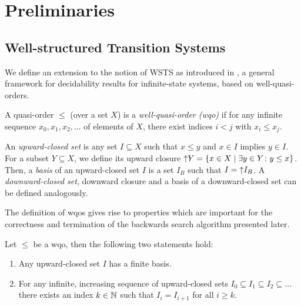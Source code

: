 \documentclass{llncs}
\begin{document}
\section{Preliminaries}
\label{sec:preliminaries}

\subsection{Well-structured Transition Systems}
\label{sec:wsts}

We define an extension to the notion of WSTS as introduced in
\cite{acjt:general-decidability,fs:well-structured-everywhere}, a
general framework for decidability results for infinite-state systems,
based on well-quasi-orders.

\begin{definition}\label{def:wqo}
  A quasi-order %
  $\leq$ (over a set $X$) is a \emph{well-quasi-order (wqo)} if for
  any infinite sequence $x_0, x_1, x_2, \ldots$ of elements of $X$,
  there exist indices $i<j$ with $x_i \leq x_j$.

  An \emph{upward-closed set} is any set $I \subseteq X$ such that $x
  \leq y$ and $x \in I$ implies $y \in I$. For a subset $Y \subseteq
  X$, we define its upward closure $\mathord{\uparrow} Y = \{x \in X \mid \exists y
  \in Y \colon y \leq x\}$.  Then, a \emph{basis} of an upward-closed
  set $I$ is a set $I_B$ such that $I = \mathord{\uparrow} I_B$.
  A \emph{downward-closed set}, downward closure and a basis of a 
  downward-closed set can be defined analogously.
\end{definition}

The definition of wqos gives rise to properties which are important for 
the correctness and termination of the backwards search algorithm presented 
later.

\begin{lemma}\label{lem:wqo-ucs}
  Let $\leq$ be a wqo, then the following two statements hold:
  \begin{enumerate}
    \item Any upward-closed set $I$ has a finite basis.
    \item For any infinite, increasing sequence of upward-closed sets $I_0 
    \subseteq I_1 \subseteq I_2 \subseteq \ldots$ there exists an index $k \in 
    \mathbb{N}$ such that $I_i = I_{i+1}$ for all $i \geq k$.
  \end{enumerate}
\end{lemma}
\end{document}
